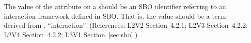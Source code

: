 The value of the  attribute on a \Model should be
an SBO identifier referring to an interaction framework defined
in SBO.  That is, the value should be a term derived from
\sbointeractionID, ``interaction''.  (References: L2V2
Section~4.2.1; L2V3 Section~4.2.2; L2V4 Section~4.2.2; 
L3V1 Section~\ref{sec:sbo}.)
